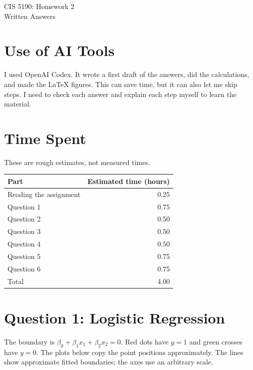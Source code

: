 \documentclass[11pt]{article}
\begin{document}
\begin{center}
{\LARGE CIS 5190: Homework 2}\\[5pt]
{\large Written Answers}
\end{center}

\section*{Use of AI Tools}
I used OpenAI Codex. It wrote a first draft of the answers, did the calculations, and made the LaTeX figures. This can save time, but it can also let me skip steps. I need to check each answer and explain each step myself to learn the material.

\section*{Time Spent}
These are rough estimates, not measured times.
\begin{center}
\begin{tabular}{lr}
\toprule
Part & Estimated time (hours)\\
\midrule
Reading the assignment & 0.25\\
Question 1 & 0.75\\
Question 2 & 0.50\\
Question 3 & 0.50\\
Question 4 & 0.50\\
Question 5 & 0.75\\
Question 6 & 0.75\\
\midrule
Total & 4.00\\
\bottomrule
\end{tabular}
\end{center}

\newpage
\section*{Question 1: Logistic Regression}
The boundary is $\beta_0+\beta_1x_1+\beta_2x_2=0$. Red dots have $y=1$ and green crosses have $y=0$. The plots below copy the point positions approximately. The lines show approximate fitted boundaries; the axes use an arbitrary scale.
\end{document}
